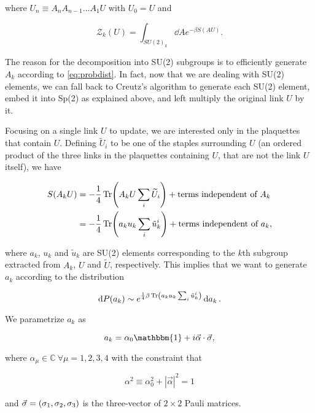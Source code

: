 \documentclass[reqno,12pt]{article}
\numberwithin{equation}{section}
\newcommand{\id}{\mathbbm{1}}
\begin{document}
where $U_{n} \equiv A_n A_{n-1} \dots A_1 U$ with $U_0 = U$ and 

\begin{equation}
	\mathcal{Z}_k(U) = \int_{SU(2)_k} \dd{A} e^{-\beta S(AU)}.
\end{equation}


The reason for the decomposition into SU(2) subgroups is to efficiently generate $A_k$ according to 
\eqref{eq:probdist}. In fact, now that we are dealing with SU(2) elements, we can fall back to Creutz's
algorithm \cite{creutz} to generate each SU(2) element, embed it into Sp(2) as explained above, and left multiply
the original link $U$ by it. 

Focusing on a single link $U$ to update, we are interested only in the plaquettes that contain $U$. Defining
$\widetilde{U}_i$ to be one of the staples surrounding $U$ (an ordered product of the three links in the plaquettes
containing $U$, that are not the link $U$ itself), we have 

\begin{align}
	S(A_k U) &= -\frac{1}{4} \Tr(A_k U \sum_i \widetilde{U}_i) + \text{terms independent of } A_k \\
	&= -\frac{1}{4} \Tr(a_k u_k \sum_i \tilde{u}_k^i) + \text{terms independent of } a_k, 
\end{align}

where $a_k$, $u_k$ and $\tilde{u}_k$ are SU(2) elements corresponding to the $k$th
subgroup extracted from $A_k$, $U$ and $\widetilde{U}$, respectively. This implies that we want to generate
$a_k$ according to the distribution

\begin{equation}
	\dd{P(a_k)} \sim e^{\frac{1}{4}\beta\Tr(a_k u_k \sum_i \tilde{u}_k^i)} \dd{a_k}.
\end{equation}

We parametrize $a_k$ as

\begin{equation} \label{eq:su2parametrization}
	a_k = \alpha_0 \id + i \vec{\alpha} \cdot \vec{\sigma},
\end{equation}

where $\alpha_\mu \in \mathbb{C} \ \forall \mu = 1, 2, 3, 4$ with the constraint that 

\begin{equation}
	\alpha^2 \equiv \alpha_0^2 + |\vec{\alpha}|^2 = 1
\end{equation} 

and $\vec{\sigma} = \qty(\sigma_1, \sigma_2, \sigma_3)$ is the three-vector of $2 \times 2$ Pauli matrices. 
\end{document}
